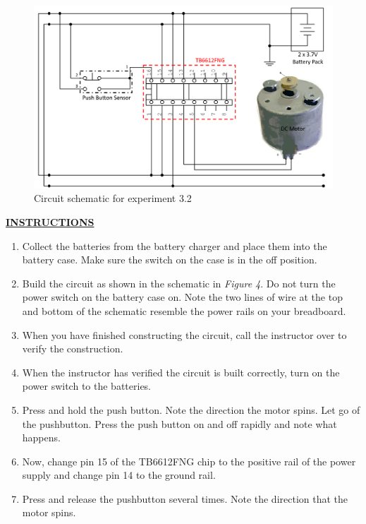 \documentclass[12pt]{article}
\begin{document}
\begin{figure}[H]
    \centering
    \includegraphics[width=12cm]{photos/lab/motorcircuitlabeled.png}
    \caption{Circuit schematic for experiment 3.2}
\end{figure}

\textbf{\underline{INSTRUCTIONS}}
\begin{enumerate}
    \item Collect the batteries from the battery charger and place them into the battery case. Make sure the switch on the case is in the off position.
    \item Build the circuit as shown in the schematic in \textit{Figure 4}. Do not turn the power switch on the battery case on. Note the two lines of wire at the top and bottom of the schematic resemble the power rails on your breadboard.
    \item When you have finished constructing the circuit, call the instructor over to verify the construction. 
    \item When the instructor has verified the circuit is built correctly, turn on the power switch to the batteries. 
    \item Press and hold the push button. Note the direction the motor spins. Let go of the pushbutton. Press the push button on and off rapidly and note what happens.
    \item Now, change pin 15 of the TB6612FNG chip to the positive rail of the power supply and change pin 14 to the ground rail.
    \item Press and release the pushbutton several times. Note the direction that the motor spins. 
\end{enumerate}
\newpage
\end{document}

